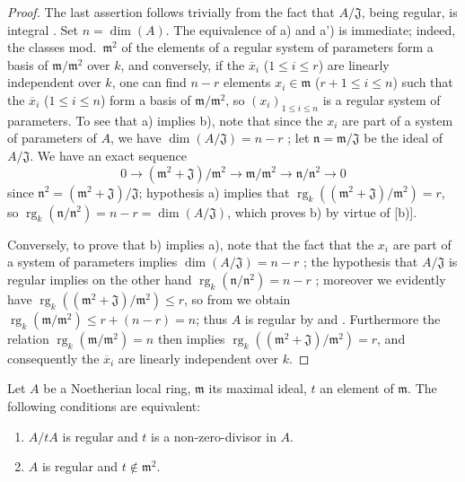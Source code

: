 \begin{proof}
The last assertion follows trivially from the fact that $A/\mathfrak{J}$, being regular, is integral .
Set $n=\dim(A)$.
The equivalence of a) and a') is immediate;
indeed, the classes mod.~$\mathfrak{m}^2$ of the elements of a regular system of parameters form a basis of $\mathfrak{m}/\mathfrak{m}^2$ over $k$, and conversely, if the $\overline{x}_i$ ($1\leq i\leq r$) are linearly independent over $k$, one can find $n-r$ elements $x_i\in\mathfrak{m}$ ($r+1\leq i\leq n$) such that the $\overline{x}_i$ ($1\leq i\leq n$) form a basis of $\mathfrak{m}/\mathfrak{m}^2$, so $(x_i)_{1\leq i\leq n}$ is a regular system of parameters.
To see that a) implies b), note that since the $x_i$ are part of a system of parameters of $A$, we have $\dim(A/\mathfrak{J})=n-r$ ;
let $\mathfrak{n}=\mathfrak{m}/\mathfrak{J}$ be the ideal of $A/\mathfrak{J}$.
We have an exact sequence
\[
\label{0.17.1.7.1}
  0\to(\mathfrak{m}^2+\mathfrak{J})/\mathfrak{m}^2\to\mathfrak{m}/\mathfrak{m}^2\to\mathfrak{n}/\mathfrak{n}^2\to 0
  \tag{17.1.7.1}
\]
since $\mathfrak{n}^2=(\mathfrak{m}^2+\mathfrak{J})/\mathfrak{J}$;
hypothesis a) implies that $\operatorname{rg}_k((\mathfrak{m}^2+\mathfrak{J})/\mathfrak{m}^2)=r$, so $\operatorname{rg}_k(\mathfrak{n}/\mathfrak{n}^2)=n-r=\dim(A/\mathfrak{J})$, which proves b) by virtue of [b)].

Conversely, to prove that b) implies a), note that the fact that the $x_i$ are part of a system of parameters implies $\dim(A/\mathfrak{J})=n-r$ ;
the hypothesis that $A/\mathfrak{J}$ is regular implies on the other hand $\operatorname{rg}_k(\mathfrak{n}/\mathfrak{n}^2)=n-r$ ;
moreover we evidently have $\operatorname{rg}_k((\mathfrak{m}^2+\mathfrak{J})/\mathfrak{m}^2)\leq r$, so from  we obtain $\operatorname{rg}_k(\mathfrak{m}/\mathfrak{m}^2)\leq r+(n-r)=n$;
thus $A$ is regular by  and .
Furthermore the relation $\operatorname{rg}_k(\mathfrak{m}/\mathfrak{m}^2)=n$ then implies $\operatorname{rg}_k((\mathfrak{m}^2+\mathfrak{J})/\mathfrak{m}^2)=r$, and consequently the $\overline{x}_i$ are linearly independent over $k$.
\end{proof}

\begin{corollary}[17.1.8]
\label{0.17.1.8}
Let $A$ be a Noetherian local ring, $\mathfrak{m}$ its maximal ideal, $t$ an element of $\mathfrak{m}$.
The following conditions are equivalent:
\begin{enumerate}
  \item[{\rm a)}] $A/tA$ is regular and $t$ is a non-zero-divisor in $A$.
  \item[{\rm b)}] $A$ is regular and $t\notin\mathfrak{m}^2$.
\end{enumerate}
\end{corollary}


